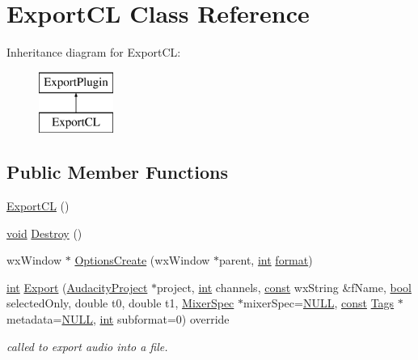 \hypertarget{class_export_c_l}{}\section{Export\+CL Class Reference}
\label{class_export_c_l}
Inheritance diagram for Export\+CL\+:\begin{figure}[H]
\begin{center}
\leavevmode
\includegraphics[height=2.000000cm]{class_export_c_l}
\end{center}
\end{figure}
\subsection*{Public Member Functions}
\begin{DoxyCompactItemize}
\item 
\hyperlink{class_export_c_l_a1e5711e273c64a46a7b134b27c411086}{Export\+CL} ()
\item 
\hyperlink{sound_8c_ae35f5844602719cf66324f4de2a658b3}{void} \hyperlink{class_export_c_l_a10f700af77a490a4db79250b79a882d6}{Destroy} ()
\item 
wx\+Window $\ast$ \hyperlink{class_export_c_l_a37672f520a27176e30c4b6c72e231898}{Options\+Create} (wx\+Window $\ast$parent, \hyperlink{xmltok_8h_a5a0d4a5641ce434f1d23533f2b2e6653}{int} \hyperlink{_export_p_c_m_8cpp_a317afff57d87a89158c2b038d37b2b08}{format})
\item 
\hyperlink{xmltok_8h_a5a0d4a5641ce434f1d23533f2b2e6653}{int} \hyperlink{class_export_c_l_ac1921902f19b81fe4669381a5ba0cfe3}{Export} (\hyperlink{class_audacity_project}{Audacity\+Project} $\ast$project, \hyperlink{xmltok_8h_a5a0d4a5641ce434f1d23533f2b2e6653}{int} channels, \hyperlink{getopt1_8c_a2c212835823e3c54a8ab6d95c652660e}{const} wx\+String \&f\+Name, \hyperlink{mac_2config_2i386_2lib-src_2libsoxr_2soxr-config_8h_abb452686968e48b67397da5f97445f5b}{bool} selected\+Only, double t0, double t1, \hyperlink{class_mixer_spec}{Mixer\+Spec} $\ast$mixer\+Spec=\hyperlink{px__mixer_8h_a070d2ce7b6bb7e5c05602aa8c308d0c4}{N\+U\+LL}, \hyperlink{getopt1_8c_a2c212835823e3c54a8ab6d95c652660e}{const} \hyperlink{class_tags}{Tags} $\ast$metadata=\hyperlink{px__mixer_8h_a070d2ce7b6bb7e5c05602aa8c308d0c4}{N\+U\+LL}, \hyperlink{xmltok_8h_a5a0d4a5641ce434f1d23533f2b2e6653}{int} subformat=0) override
\begin{DoxyCompactList}\small\item\em called to export audio into a file. \end{DoxyCompactList}\end{DoxyCompactItemize}
